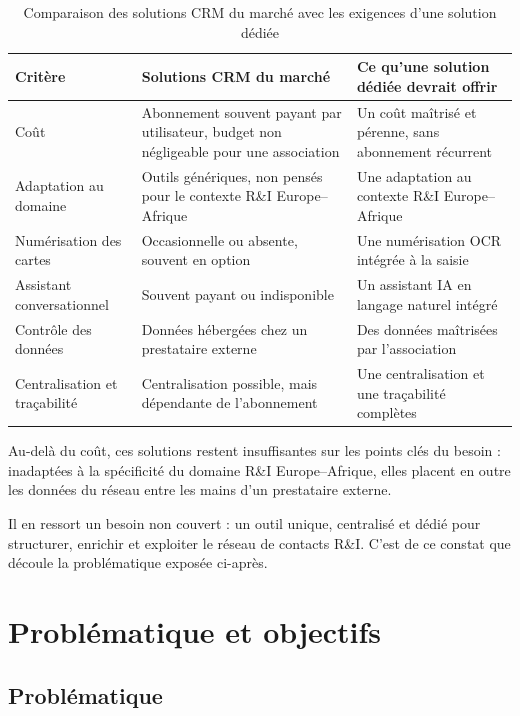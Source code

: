\begin{table}[H]
\centering
\small
\begin{tabularx}{\textwidth}{|l|X|X|}
\hline
\textbf{Critère} & \textbf{Solutions CRM du marché} & \textbf{Ce qu'une solution dédiée devrait offrir} \\
\hline
Coût & Abonnement souvent payant par utilisateur, budget non négligeable pour une association & Un coût maîtrisé et pérenne, sans abonnement récurrent \\
\hline
Adaptation au domaine & Outils génériques, non pensés pour le contexte R\&I Europe--Afrique & Une adaptation au contexte R\&I Europe--Afrique \\
\hline
Numérisation des cartes & Occasionnelle ou absente, souvent en option & Une numérisation \ac{OCR} intégrée à la saisie \\
\hline
Assistant conversationnel & Souvent payant ou indisponible & Un assistant IA en langage naturel intégré \\
\hline
Contrôle des données & Données hébergées chez un prestataire externe & Des données maîtrisées par l'association \\
\hline
Centralisation et traçabilité & Centralisation possible, mais dépendante de l'abonnement & Une centralisation et une traçabilité complètes \\
\hline
\end{tabularx}
\caption{Comparaison des solutions CRM du marché avec les exigences d'une solution dédiée}
\label{tab:crm}
\end{table}

Au-delà du coût, ces solutions restent insuffisantes sur les points clés du besoin : inadaptées à la spécificité du domaine R\&I Europe--Afrique, elles placent en outre les données du réseau entre les mains d'un prestataire externe.

Il en ressort un besoin non couvert : un outil unique, centralisé et dédié pour structurer, enrichir et exploiter le réseau de contacts R\&I. C'est de ce constat que découle la problématique exposée ci-après.

\section{Problématique et objectifs}

\subsection{Problématique}

